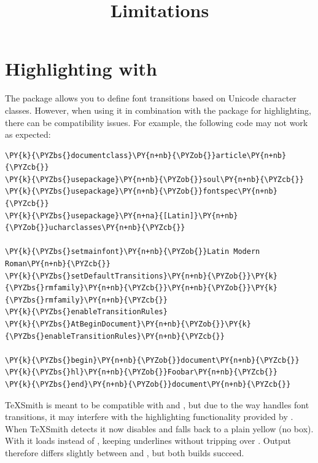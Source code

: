 \documentclass[a4paper,twoside]{article}
\title{Limitations}
\author{}\date{}
\begin{document}
\maketitle
\section{Highlighting with }
The  package allows you to define font transitions based on Unicode character classes. However, when using it in combination with the  package for highlighting, there can be compatibility issues. For example, the following code may not work as expected:
\begin{tscode}[lang=latex, engine=pygments]
\begin{Verbatim}[commandchars=\\\{\},breaklines, breakanywhere, commandchars=\\\{\}]
\PY{k}{\PYZbs{}documentclass}\PY{n+nb}{\PYZob{}}article\PY{n+nb}{\PYZcb{}}
\PY{k}{\PYZbs{}usepackage}\PY{n+nb}{\PYZob{}}soul\PY{n+nb}{\PYZcb{}}
\PY{k}{\PYZbs{}usepackage}\PY{n+nb}{\PYZob{}}fontspec\PY{n+nb}{\PYZcb{}}
\PY{k}{\PYZbs{}usepackage}\PY{n+na}{[Latin]}\PY{n+nb}{\PYZob{}}ucharclasses\PY{n+nb}{\PYZcb{}}

\PY{k}{\PYZbs{}setmainfont}\PY{n+nb}{\PYZob{}}Latin Modern Roman\PY{n+nb}{\PYZcb{}}
\PY{k}{\PYZbs{}setDefaultTransitions}\PY{n+nb}{\PYZob{}}\PY{k}{\PYZbs{}rmfamily}\PY{n+nb}{\PYZcb{}}\PY{n+nb}{\PYZob{}}\PY{k}{\PYZbs{}rmfamily}\PY{n+nb}{\PYZcb{}}
\PY{k}{\PYZbs{}enableTransitionRules}
\PY{k}{\PYZbs{}AtBeginDocument}\PY{n+nb}{\PYZob{}}\PY{k}{\PYZbs{}enableTransitionRules}\PY{n+nb}{\PYZcb{}}

\PY{k}{\PYZbs{}begin}\PY{n+nb}{\PYZob{}}document\PY{n+nb}{\PYZcb{}}
\PY{k}{\PYZbs{}hl}\PY{n+nb}{\PYZob{}}Foobar\PY{n+nb}{\PYZcb{}}
\PY{k}{\PYZbs{}end}\PY{n+nb}{\PYZob{}}document\PY{n+nb}{\PYZcb{}}
\end{Verbatim}
\end{tscode}
TeXSmith is meant to be compatible with  and , but due to the way  handles font transitions, it may interfere with the highlighting functionality provided by . When TeXSmith detects  it now disables  and falls back to a plain yellow  (no box). With  it loads  instead of , keeping underlines without tripping over . Output therefore differs slightly between  and , but both builds succeed.
\end{document}
